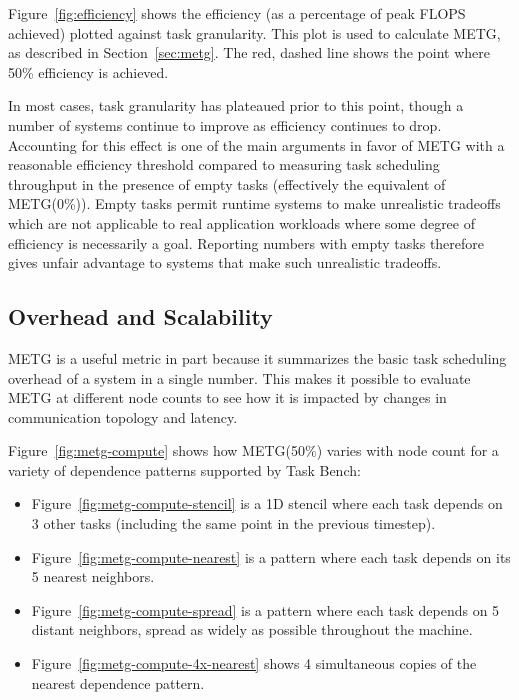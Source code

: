 Figure~\ref{fig:efficiency} shows the efficiency (as a percentage of
peak FLOPS achieved) plotted against task granularity. This plot is
used to calculate METG, as described in Section~\ref{sec:metg}. The
red, dashed line shows the point where 50\% efficiency is achieved.

In most cases, task granularity has plateaued prior to this point,
though a number of systems continue to improve as efficiency continues
to drop. Accounting for this effect is one of the main arguments in
favor of METG with a reasonable efficiency threshold compared to
measuring task scheduling throughput in the presence of empty tasks
(effectively the equivalent of METG(0\%)). Empty tasks permit runtime
systems to make unrealistic tradeoffs which are not applicable to real
application workloads where some degree of efficiency is necessarily a
goal. Reporting numbers with empty tasks therefore gives unfair
advantage to systems that make such unrealistic tradeoffs.

\subsection{Overhead and Scalability}

METG is a useful metric in part because it summarizes the basic task
scheduling overhead of a system in a single number. This makes it
possible to evaluate METG at different node counts to see how it is
impacted by changes in communication topology and latency.

Figure~\ref{fig:metg-compute} shows how METG(50\%) varies with node
count for a variety of dependence patterns supported by Task Bench:

\begin{itemize}
\item Figure~\ref{fig:metg-compute-stencil} is a 1D stencil where each
  task depends on 3 other tasks (including the same point in the
  previous timestep).
\item Figure~\ref{fig:metg-compute-nearest} is a pattern where each
  task depends on its 5 nearest neighbors.
\item Figure~\ref{fig:metg-compute-spread} is a pattern where each
  task depends on 5 distant neighbors, spread as widely as possible
  throughout the machine.
\item Figure~\ref{fig:metg-compute-4x-nearest} shows 4 simultaneous
  copies of the nearest dependence pattern.
\end{itemize}

